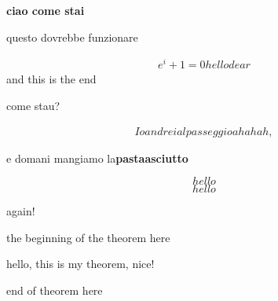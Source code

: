 \textbf{ciao come stai}

questo dovrebbe funzionare

\begin{align*}
e^i+1=0 hello dear
\end{align*}
and this is the end

come stau?

\begin{align}
Io andrei al passeggio ahahah,
\end{align}

e domani mangiamo la\textbf{pastaasciutto}

\begin{equation} hello \end{equation}
\begin{equation*} hello \end{equation*}

again! \centering

the beginning of the theorem {\Large here}
\begin{theorem}
hello, this is my theorem, nice!
\end{theorem}
end of theorem here
